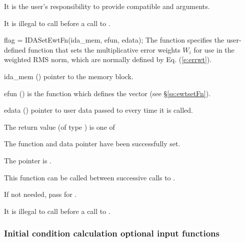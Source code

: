 {{  {\warn} It is the user's responsibility to provide compatible  and
   arguments.

  {\warn} It is illegal to call  before a call to
  .

}
{
flag = IDASetEwtFn(ida\_mem, efun, edata);
}
{
  The function  specifies the user-defined function that
  sets the multiplicative error weights $W_i$ for use in the weighted
  RMS norm, which are normally defined by Eq. (\ref{e:errwt}).
}
{
  \begin{args}
  \item[ida\_mem] ()
    pointer to the {\ida} memory block.
  \item[efun] () 
    is the {\C} function which defines the  vector (see
    \S\ref{ss:ewtsetFn}).
  \item[edata] ()
    pointer to user data passed to  every time it is called.
  \end{args}
}
{
  The return value  (of type ) is one of
  \begin{args}
  \item[\Id{IDA\_SUCCESS}] 
    The function  and data pointer  have been successfully set.
  \item[\Id{IDA\_MEM\_NULL}]
    The  pointer is .
  \end{args}
}
{
  This function can be called between successive calls to .

  If not needed, pass  for .

  {\warn} It is illegal to call  before a call to .
}

\subsubsection{Initial condition calculation optional input functions}\label{sss:optin_iccalc}

}
